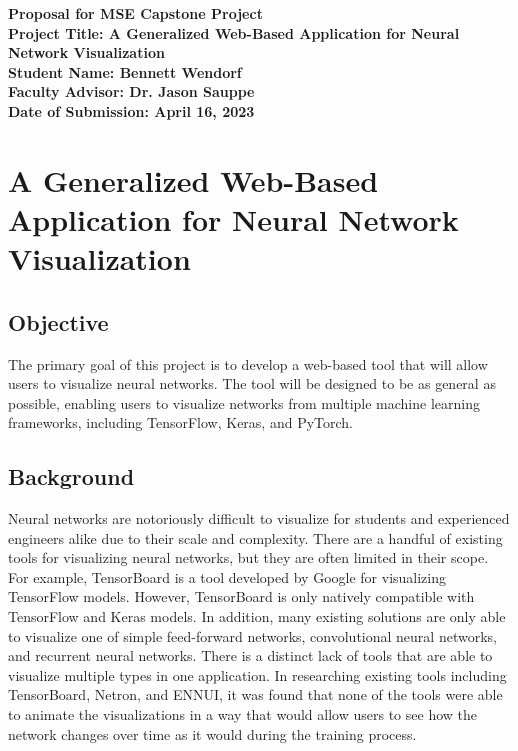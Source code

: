 \documentclass[letterpaper, 12pt]{report}
\begin{document}
\begin{titlepage}
	\begin{center}
		\vspace*{2in}
		\begin{doublespace}
			\LARGE \textbf{Proposal for MSE Capstone Project} \\
            \vspace*{0.5in}
			\large
            \textbf{Project Title: A Generalized Web-Based Application for Neural Network Visualization} \\
			\vspace*{0.5in}
			\textbf{Student Name: Bennett Wendorf} \\
            \textbf{Faculty Advisor: Dr. Jason Sauppe} \\
            \textbf{Date of Submission: April 16, 2023} \\
		\end{doublespace}
	\end{center}
\end{titlepage}

\section*{A Generalized Web-Based Application for Neural Network Visualization}

\subsection*{Objective}
The primary goal of this project is to develop a web-based tool that will allow users to visualize neural networks. The tool will be designed to be as general as possible, enabling users to visualize networks from multiple machine learning frameworks, including TensorFlow, Keras, and PyTorch. 

\subsection*{Background}
Neural networks are notoriously difficult to visualize for students and experienced engineers alike due to their scale and complexity. There are a handful of existing tools for visualizing neural networks, but they are often limited in their scope. For example, TensorBoard is a tool developed by Google for visualizing TensorFlow models. However, TensorBoard is only natively compatible with TensorFlow and Keras models. In addition, many existing solutions are only able to visualize one of simple feed-forward networks, convolutional neural networks, and recurrent neural networks. There is a distinct lack of tools that are able to visualize multiple types in one application. In researching existing tools including TensorBoard, Netron, and ENNUI, it was found that none of the tools were able to animate the visualizations in a way that would allow users to see how the network changes over time as it would during the training process.
\end{document}
